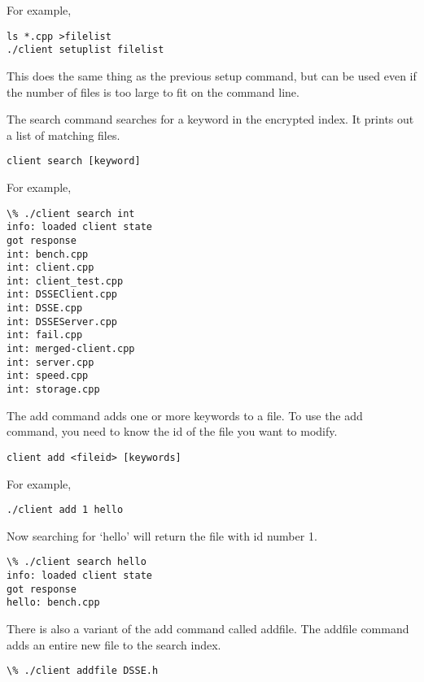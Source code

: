 For example,

\begin{lstlisting}
ls *.cpp >filelist
./client setuplist filelist
\end{lstlisting}

This does the same thing as the previous setup command, but can be used even if
the number of files is too large to fit on the command line.


The search command searches for a keyword in the encrypted index.
It prints out a list of matching files.

\begin{lstlisting}
client search [keyword]
\end{lstlisting}

For example,

\begin{lstlisting}
\% ./client search int
info: loaded client state
got response
int: bench.cpp
int: client.cpp
int: client_test.cpp
int: DSSEClient.cpp
int: DSSE.cpp
int: DSSEServer.cpp
int: fail.cpp
int: merged-client.cpp
int: server.cpp
int: speed.cpp
int: storage.cpp
\end{lstlisting}


The add command adds one or more keywords to a file.
To use the add command, you need to know the id of the file you want to modify.

\begin{lstlisting}
client add <fileid> [keywords]
\end{lstlisting}

For example,

\begin{lstlisting}
./client add 1 hello
\end{lstlisting}

Now searching for `hello' will return the file with id number 1.

\begin{lstlisting}
\% ./client search hello
info: loaded client state
got response
hello: bench.cpp
\end{lstlisting}

There is also a variant of the add command called addfile.
The addfile command adds an entire new file to the search index.

\begin{lstlisting}
\% ./client addfile DSSE.h
\end{lstlisting}

